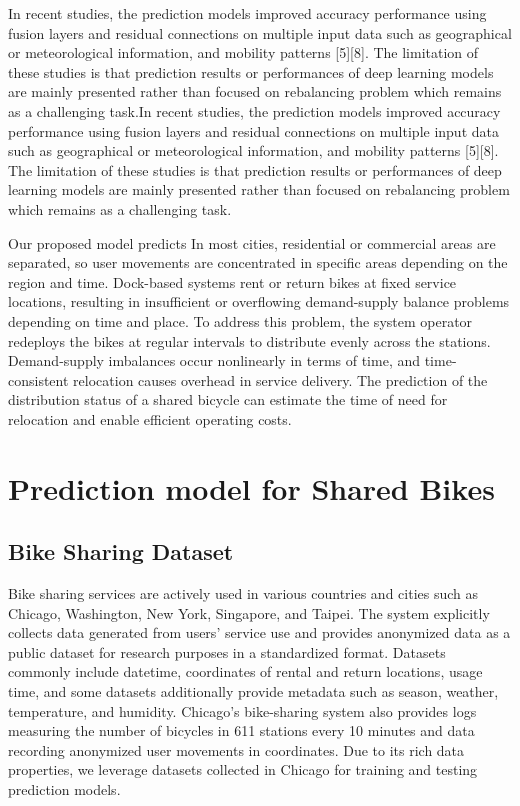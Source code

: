 \documentclass[conference]{IEEEtran}
\begin{document}
 In recent studies, the prediction models improved accuracy performance using fusion layers and residual connections on multiple input data such as geographical or meteorological information, and mobility patterns [5][8]. The limitation of these studies is that prediction results or performances of deep learning models are mainly presented rather than focused on rebalancing problem which remains as a challenging task.In recent studies, the prediction models improved accuracy performance using fusion layers and residual connections on multiple input data such as geographical or meteorological information, and mobility patterns [5][8]. The limitation of these studies is that prediction results or performances of deep learning models are mainly presented rather than focused on rebalancing problem which remains as a challenging task.

 Our proposed model predicts In most cities, residential or commercial areas are separated, so user movements are concentrated in specific areas depending on the region and time. Dock-based systems rent or return bikes at fixed service locations, resulting in insufficient or overflowing demand-supply balance problems depending on time and place. To address this problem, the system operator redeploys the bikes at regular intervals to distribute evenly across the stations. Demand-supply imbalances occur nonlinearly in terms of time, and time-consistent relocation causes overhead in service delivery. The prediction of the distribution status of a shared bicycle can estimate the time of need for relocation and enable efficient operating costs.

\section{Prediction model for Shared Bikes}

\subsection{Bike Sharing Dataset}
 Bike sharing services are actively used in various countries and cities such as Chicago, Washington, New York, Singapore, and Taipei. The system explicitly collects data generated from users' service use and provides anonymized data as a public dataset for research purposes in a standardized format. Datasets commonly include datetime, coordinates of rental and return locations, usage time, and some datasets additionally provide metadata such as season, weather, temperature, and humidity. Chicago's bike-sharing system also provides logs measuring the number of bicycles in 611 stations every 10 minutes and data recording anonymized user movements in coordinates. Due to its rich data properties, we leverage datasets collected in Chicago for training and testing prediction models.
 
\end{document}
